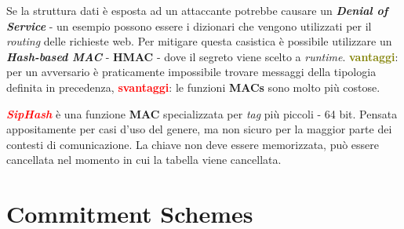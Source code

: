 \begin{flushleft}
    Se la struttura dati è esposta ad un attaccante potrebbe causare un \textbf{\textit{Denial of Service}} - un esempio possono essere i dizionari che vengono utilizzati per il \textit{routing} delle richieste web. Per mitigare questa casistica è possibile utilizzare un \textbf{\textit{Hash-based MAC}} - \textbf{HMAC} - dove il segreto viene scelto a \textit{runtime}. \textcolor{olive}{\textbf{vantaggi}}: per un avversario è praticamente impossibile trovare messaggi della tipologia definita in precedenza, \textcolor{red}{\textbf{svantaggi}}: le funzioni \textbf{MACs} sono molto più costose.
\end{flushleft}
\begin{boxA}
    \textcolor{red}{\textbf{\textit{SipHash}}} è una funzione \textbf{MAC} specializzata per \textit{tag} più piccoli - 64 bit. Pensata appositamente per casi d'uso del genere, ma non sicuro per la maggior parte dei contesti di comunicazione. La chiave non deve essere memorizzata, può essere cancellata nel momento in cui la tabella viene cancellata.
\end{boxA}

\section{Commitment Schemes}

